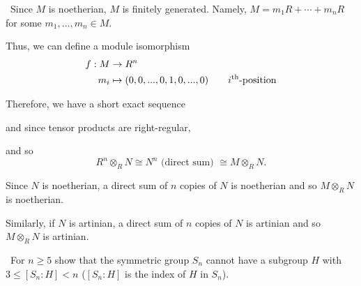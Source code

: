 \documentclass[12pt]{AlgebraQual}
\begin{document}
\begin{solution}$\,$
Since $M$ is noetherian, $M$ is finitely generated. Namely, $M=m_1R+\cdots+m_nR$ for some $m_1,...,m_n\in M$.

Thus, we can define a module isomorphism \begin{align*}
    f:M&\to R^n\\
    m_i&\mapsto (0,0,...,0,1,0,...,0)\qquad i^\text{th}\text{-position}
\end{align*}

Therefore, we have a short exact sequence
\begin{center}
\end{center} and since tensor products are right-regular,

\begin{center}
\end{center}

and so $$R^n\otimes_RN\cong N^n\text{ (direct sum) }\cong M\otimes_RN.$$

Since $N$ is noetherian, a direct sum of $n$ copies of $N$ is noetherian and so $M\otimes_RN$ is noetherian.

Similarly, if $N$ is artinian, a direct sum of $n$ copies of $N$ is artinian and so $M\otimes_R N$ is artinian.

\end{solution}
\newpage



\begin{problem} $\,$
For $n\ge 5$ show that the symmetric group $S_n$ cannot have a subgroup $H$ with $3\le [S_n:H]<n$ ($[S_n:H]$ is the index of $H$ in $S_n$).
\end{problem}
\end{document}
